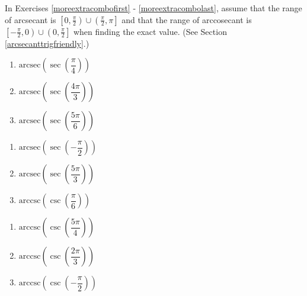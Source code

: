 In Exercises \ref{moreextracombofirst} - \ref{moreextracombolast}, assume that the range of arcsecant is $\left[0, \frac{\pi}{2} \right) \cup \left( \frac{\pi}{2}, \pi \right]$ and that the range of arccosecant is $\left[ -\frac{\pi}{2}, 0 \right)  \cup \left(0, \frac{\pi}{2} \right]$ when finding the exact value. (See Section \ref{arcsecanttrigfriendly}.)


\begin{multicols}{3}

\begin{enumerate}

\setcounter{enumi}{\value{HW}}

\item  $\text{arcsec}\left(\sec\left(\dfrac{\pi}{4}\right) \right)$  \label{moreextracombofirst}
\item  $\text{arcsec}\left(\sec\left(\dfrac{4\pi}{3}\right) \right)$
\item  $\text{arcsec}\left(\sec\left( \dfrac{5\pi}{6} \right) \right)$

\setcounter{HW}{\value{enumi}}

\end{enumerate}

\end{multicols}

\begin{multicols}{3}

\begin{enumerate}

\setcounter{enumi}{\value{HW}}

\item  $\text{arcsec}\left(\sec\left(-\dfrac{\pi}{2} \right) \right)$ 
\item  $\text{arcsec}\left(\sec\left(\dfrac{5\pi}{3}\right) \right)$
\item  $\text{arccsc}\left(\csc\left(\dfrac{\pi}{6}\right) \right)$ 

\setcounter{HW}{\value{enumi}}

\end{enumerate}

\end{multicols}

\begin{multicols}{3}

\begin{enumerate}

\setcounter{enumi}{\value{HW}}

\item  $\text{arccsc}\left(\csc\left(\dfrac{5\pi}{4}\right) \right)$
\item  $\text{arccsc}\left(\csc\left( \dfrac{2\pi}{3} \right) \right)$
\item  $\text{arccsc}\left(\csc\left(-\dfrac{\pi}{2} \right) \right)$ 

\setcounter{HW}{\value{enumi}}

\end{enumerate}

\end{multicols}

